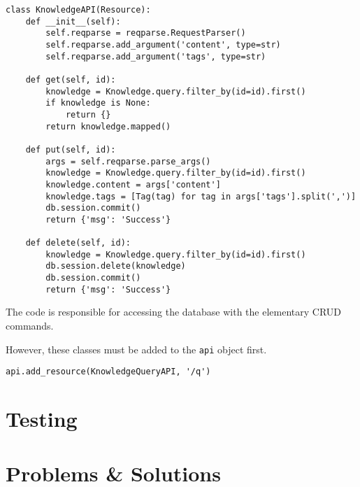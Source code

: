 \documentclass[11pt, a4paper]{article}
\begin{document}
\begin{lstlisting}
class KnowledgeAPI(Resource):
    def __init__(self):
        self.reqparse = reqparse.RequestParser()
        self.reqparse.add_argument('content', type=str)
        self.reqparse.add_argument('tags', type=str)

    def get(self, id):
        knowledge = Knowledge.query.filter_by(id=id).first()
        if knowledge is None:
            return {}
        return knowledge.mapped()

    def put(self, id):
        args = self.reqparse.parse_args()
        knowledge = Knowledge.query.filter_by(id=id).first()
        knowledge.content = args['content']
        knowledge.tags = [Tag(tag) for tag in args['tags'].split(',')]
        db.session.commit()
        return {'msg': 'Success'}

    def delete(self, id):
        knowledge = Knowledge.query.filter_by(id=id).first()
        db.session.delete(knowledge)
        db.session.commit()
        return {'msg': 'Success'}
\end{lstlisting}

\vspace{10pt}

The code is responsible for accessing the database with the elementary CRUD
commands. 

However, these classes must be added to the \lstinline|api| object first. 

\begin{lstlisting}
api.add_resource(KnowledgeQueryAPI, '/q')
\end{lstlisting}

\subsection{}

\section{Testing}
\section{Problems \& Solutions}

\nocite{*}


\end{document}
